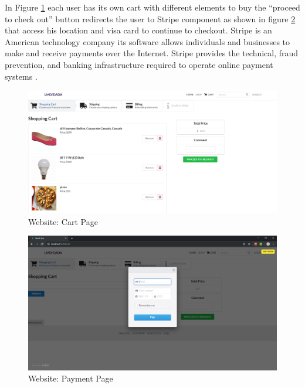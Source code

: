 In Figure \ref{fig: cart} each user has its own cart with different elements to buy the “proceed to check out” button redirects the user to Stripe component as shown in figure  \ref{fig: payment} that access his location and visa card to continue to checkout.
Stripe is an American technology company its software allows individuals and businesses to make and receive payments over the Internet. Stripe provides the technical, fraud prevention, and banking infrastructure required to operate online payment systems \cite{Stripe}.

\begin{figure}[htp]%
    \center%
    \includegraphics[width=1\textwidth]{images/Software/cart.PNG}%
    \caption[Website: Cart Page]{Website: Cart Page}\label{fig: cart}%
  \end{figure}
  
   \begin{figure}[htp]%
    \center%
    \includegraphics[width=1\textwidth]{images/Software/payment.PNG}%
    \caption[Website: Payment Page]{Website: Payment Page}\label{fig: payment}%
  \end{figure}\newpage

